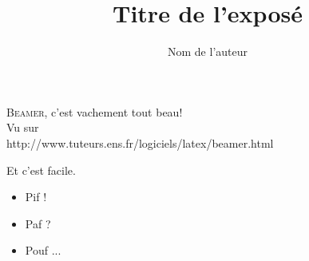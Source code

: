 \documentclass{beamer}
\title{Titre de l'expos\'e}
\author{Nom de l'auteur}\institute{Institution}
\begin{document}
\begin{frame}
\titlepage
\end{frame}

\begin{frame}
\textsc{Beamer}, c'est vachement tout beau!\\
Vu sur \\
http://www.tuteurs.ens.fr/logiciels/latex/beamer.html
\end{frame}

\begin{frame}
Et c'est facile.
\end{frame}

\begin{frame}
\begin{itemize}
\item<1,3> Pif !
\item<2-4> Paf ?
\item Pouf ...
\end{itemize}
\end{frame}
\end{document}
